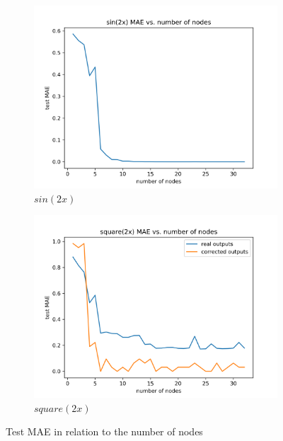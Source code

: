 \documentclass[a4paper]{article}
\begin{document}
\begin{figure}[h!]
    \centering
    \begin{subfigure}{.5\textwidth}
      \centering
      \includegraphics[width=1.0\linewidth]{img/3-1_sin2x.png}
      \caption{$sin(2x)$}
    \end{subfigure}%
    \begin{subfigure}{.5\textwidth}
      \centering
      \includegraphics[width=1.0\linewidth]{img/3-1_square2x.png}
      \caption{$square(2x)$}
    \end{subfigure}
    \caption{Test MAE in relation to the number of nodes}
    \label{fig:3-1_performance}
\end{figure}
\end{document}
